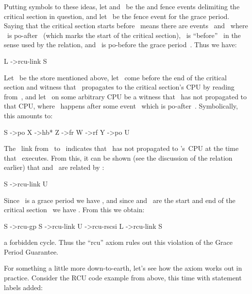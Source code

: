 Putting symbols to these ideas, let  and~ be the
 and  fence events
delimiting the critical section in question, and let ~be the
 fence event for the grace period.
Saying that the critical section starts before~ means there
are events~ and~ where ~is po-after~
(which marks the start of the critical section), ~is
``before''~ in the sense used by the  relation,
and ~is po-before the grace period~.  Thus we have:

\begin{VerbatimU}
	L ->rcu-link S
\end{VerbatimU}

Let ~be the store mentioned above, let ~come before
the end of the critical section and witness that ~propagates
to the critical section's CPU by reading from~, and let ~on
some arbitrary CPU be a witness that ~has not propagated to
that CPU, where ~happens after some event~ which is
po-after~.
Symbolically, this amounts to:

\begin{VerbatimU}
	S ->po X ->hb* Z ->fr W ->rf Y ->po U
\end{VerbatimU}

The ~link from~ to~ indicates that ~has not
propagated to 's~CPU at the time that ~executes.
From this, it can be shown (see the discussion of the 
relation earlier) that  and~ are related by :

\begin{VerbatimU}
	S ->rcu-link U
\end{VerbatimU}

Since ~is a grace period we have , and
since  and~ are the start and end of the critical
section~ we have .
From this we obtain:

\begin{VerbatimU}
	S ->rcu-gp S ->rcu-link U ->rcu-rscsi L ->rcu-link S
\end{VerbatimU}

\noindent%
a forbidden cycle.
Thus the ``rcu'' axiom rules out this violation of the Grace Period Guarantee.

For something a little more down-to-earth, let's see how the axiom
works out in practice.
Consider the RCU code example from above, this time with statement
labels added:

